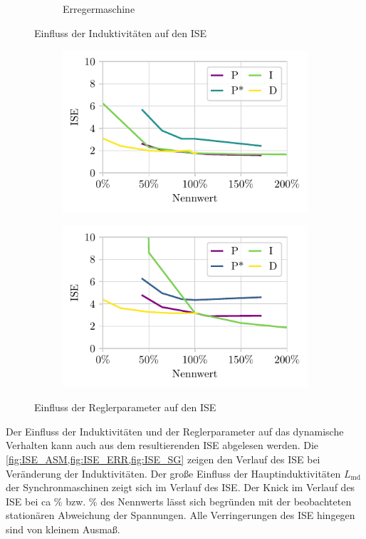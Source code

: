 \begin{figure}
\begin{subfigure}{\textwidth}
        \caption{Erregermaschine }
        \label{fig:ISE_ERR}    
    \end{subfigure}
    \caption{Einfluss der Induktivitäten auf den ISE}
\end{figure}
\begin{figure}
    \centering
    \begin{subfigure}{.49\linewidth}
        \centering
        \includegraphics{Bilder/regler_ISE.pdf}    
    \end{subfigure}
    \begin{subfigure}{.49\linewidth}
        \centering
        \includegraphics{Bilder/simulation_reglerSweep.pdf}
    \end{subfigure}
    \caption{Einfluss der Reglerparameter auf den ISE}
    \label{fig:ISE_ReglerSweep}
\end{figure}

Der Einfluss der Induktivitäten und der Reglerparameter auf das dynamische Verhalten kann auch aus dem resultierenden ISE abgelesen werden. Die \cref{fig:ISE_ASM,fig:ISE_ERR,fig:ISE_SG} zeigen den Verlauf des ISE bei Veränderung der Induktivitäten. Der große Einfluss der Hauptinduktivitäten $L_{\mathrm{md}}$ der Synchronmaschinen zeigt sich im Verlauf des ISE. Der Knick im Verlauf des ISE bei ca \unit[50]{\%} bzw. \unit[33]{\%} des Nennwerts lässt sich begründen mit der beobachteten stationären Abweichung der Spannungen. Alle Verringerungen des ISE hingegen sind von kleinem Ausmaß.


